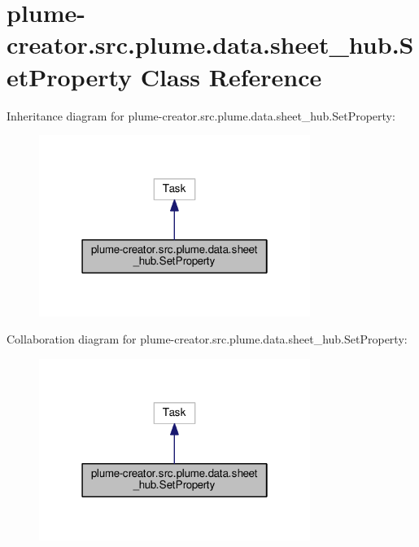\hypertarget{classplume-creator_1_1src_1_1plume_1_1data_1_1sheet__hub_1_1_set_property}{}\section{plume-\/creator.src.\+plume.\+data.\+sheet\+\_\+hub.\+Set\+Property Class Reference}
\label{classplume-creator_1_1src_1_1plume_1_1data_1_1sheet__hub_1_1_set_property}


Inheritance diagram for plume-\/creator.src.\+plume.\+data.\+sheet\+\_\+hub.\+Set\+Property\+:\nopagebreak
\begin{figure}[H]
\begin{center}
\leavevmode
\includegraphics[width=250pt]{classplume-creator_1_1src_1_1plume_1_1data_1_1sheet__hub_1_1_set_property__inherit__graph}
\end{center}
\end{figure}


Collaboration diagram for plume-\/creator.src.\+plume.\+data.\+sheet\+\_\+hub.\+Set\+Property\+:\nopagebreak
\begin{figure}[H]
\begin{center}
\leavevmode
\includegraphics[width=250pt]{classplume-creator_1_1src_1_1plume_1_1data_1_1sheet__hub_1_1_set_property__coll__graph}
\end{center}
\end{figure}

